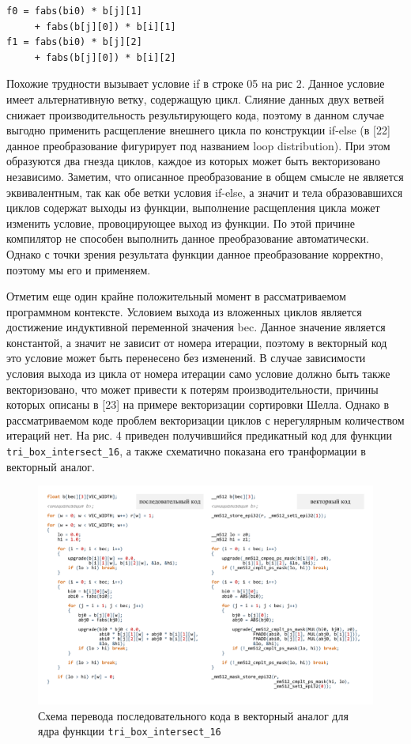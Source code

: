 \begin{lstlisting}[caption={caption},label={label}]
f0 = fabs(bi0) * b[j][1]
     + fabs(b[j][0]) * b[i][1]
f1 = fabs(bi0) * b[j][2]
     + fabs(b[j][0]) * b[i][2]
\end{lstlisting}

Похожие трудности вызывает условие if в строке 05 на рис 2. Данное условие имеет альтернативную ветку, содержащую цикл.
Слияние данных двух ветвей снижает производительность результирующего кода, поэтому в данном случае выгодно применить расщепление внешнего цикла по конструкции if-else (в [22] данное преобразование фигурирует под названием loop distribution).
При этом образуются два гнезда циклов, каждое из которых может быть векторизовано независимо.
Заметим, что описанное преобразование в общем смысле не является эквивалентным, так как обе ветки условия if-else, а значит и тела образовавшихся циклов содержат выходы из функции, выполнение расщепления цикла может изменить условие, провоцирующее выход из функции.
По этой причине компилятор не способен выполнить данное преобразование автоматически.
Однако с точки зрения результата функции данное преобразование корректно, поэтому мы его и применяем.

Отметим еще один крайне положительный момент в рассматриваемом программном контексте.
Условием выхода из вложенных циклов является достижение индуктивной переменной значения bec.
Данное значение является константой, а значит не зависит от номера итерации, поэтому в векторный код это условие может быть перенесено без изменений.
В случае зависимости условия выхода из цикла от номера итерации само условие должно быть также векторизовано, что может привести к потерям производительности, причины которых описаны в [23] на примере векторизации сортировки Шелла.
Однако в рассматриваемом коде проблем векторизации циклов с нерегулярным количеством итераций нет.
На рис. 4 приведен получившийся предикатный код для функции \texttt{tri\_box\_intersect\_16}, а также схематично показана его транформации в векторный аналог.

\begin{figure}[ht]
	\centering
		\includegraphics[width=1.0\textwidth]{./pics/text_4_mesh_intersect/final_scheme.pdf}
	\caption{Схема перевода последовательного кода в векторный аналог для ядра функции \texttt{tri\_box\_intersect\_16}}
	\label{fig:text_1_mesh_intersect_scheme}
\end{figure}

